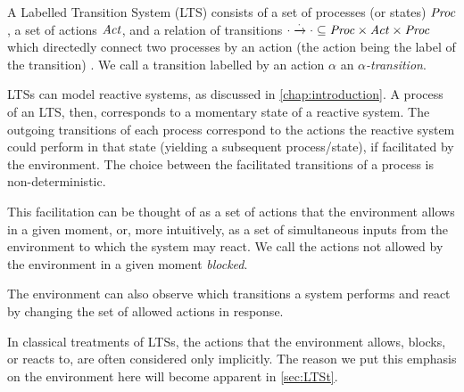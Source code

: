 %
\begin{isabellebody}%
%
%
\isadelimtheory
%
\endisadelimtheory
%
\isatagtheory
%
\endisatagtheory
{\isafoldtheory}%
%
\isadelimtheory
%
\endisadelimtheory
%
\isadelimdocument
%
\endisadelimdocument
%
\isatagdocument
%
\isamarkuptrue%
%
\endisatagdocument
{\isafolddocument}%
%
\isadelimdocument
%
\endisadelimdocument
%
\begin{isamarkuptext}%
\label{sec:LTS}%
\end{isamarkuptext}\isamarkuptrue%
%
\begin{isamarkuptext}%
A Labelled Transition System (LTS) consists of a set of processes (or states) $\mathit{Proc}$, a set of actions $\mathit{Act}$, and a relation of transitions $\cdot\xrightarrow{\cdot}\cdot \subseteq \mathit{Proc}\times\mathit{Act}\times\mathit{Proc}$ which directedly connect two processes by an action (the action being the label of the transition) \cite{reactivesystems}. We call a transition labelled by an action $\alpha$ an \emph{$\alpha$-transition}.

LTSs can model reactive systems, as discussed in \cref{chap:introduction}. A process of an LTS, then, corresponds to a momentary state of a reactive system. The outgoing transitions of each process correspond to the actions the reactive system could perform in that state (yielding a subsequent process/state), if facilitated by the environment. The choice between the facilitated transitions of a process is non-deterministic.

This facilitation can be thought of as a set of actions that the environment allows in a given moment, or, more intuitively, as a set of simultaneous inputs from the environment to which the system may react. We call the actions not allowed by the environment in a given moment \emph{blocked}.

The environment can also observe which transitions a system performs and react by changing the set of allowed actions in response.

In classical treatments of LTSs, the actions that the environment allows, blocks, or reacts to, are often considered only implicitly. The reason we put this emphasis on the environment here will become apparent in \cref{sec:LTSt}.

\end{isamarkuptext}
\end{isabellebody}
